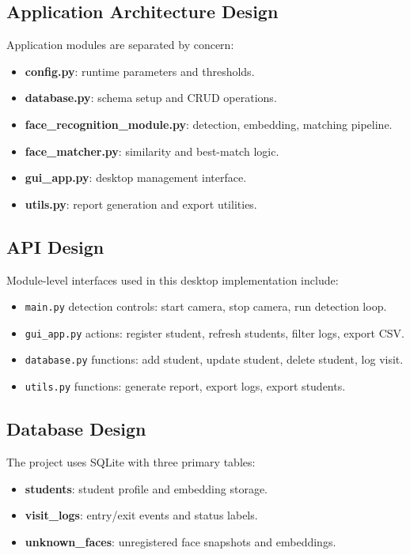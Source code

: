\documentclass{fisatprojectfinal}
\begin{document}
\subsection{Application Architecture Design}
Application modules are separated by concern:
\begin{itemize}
	\item \textbf{config.py}: runtime parameters and thresholds.
	\item \textbf{database.py}: schema setup and CRUD operations.
	\item \textbf{face\_recognition\_module.py}: detection, embedding, matching pipeline.
	\item \textbf{face\_matcher.py}: similarity and best-match logic.
	\item \textbf{gui\_app.py}: desktop management interface.
	\item \textbf{utils.py}: report generation and export utilities.
\end{itemize}

\subsection {API Design}
Module-level interfaces used in this desktop implementation include:
\begin{itemize}
	\item \texttt{main.py} detection controls: start camera, stop camera, run detection loop.
	\item \texttt{gui\_app.py} actions: register student, refresh students, filter logs, export CSV.
	\item \texttt{database.py} functions: add student, update student, delete student, log visit.
	\item \texttt{utils.py} functions: generate report, export logs, export students.
\end{itemize}

\subsection {Database Design}
The project uses SQLite with three primary tables:
\begin{itemize}
	\item \textbf{students}: student profile and embedding storage.
	\item \textbf{visit\_logs}: entry/exit events and status labels.
	\item \textbf{unknown\_faces}: unregistered face snapshots and embeddings.
\end{itemize}
\end{document}
